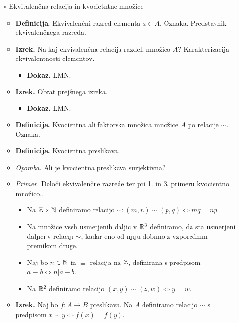 \begin{enumerate}
    \newpage
    \item[$\circ$] Ekvivalenčna relacija in kvocietntne množice
    \begin{itemize}
        \item \colorbox{purple!30}{\textbf{Definicija.}} Ekvivalenčni razred elementa $a \in A$. Oznaka. Predstavnik ekvivalenčnega razreda.
        \item \colorbox{blue!30}{\textbf{Izrek.}} Na kaj ekvivalenčna relacija razdeli množico $A$? Karakterizacija ekvivalentnosti elementov.
        \begin{itemize}
            \item \colorbox{green!30}{\textbf{Dokaz.}} LMN.
        \end{itemize}
        \item \colorbox{blue!30}{\textbf{Izrek.}} Obrat prejšnega izreka.
        \begin{itemize}
            \item \colorbox{green!30}{\textbf{Dokaz.}} LMN.
        \end{itemize}
        \item \colorbox{purple!30}{\textbf{Definicija.}} Kvocientna ali faktorska množica množice $A$ po relacije $\sim$. Oznaka.
        \item \colorbox{purple!30}{\textbf{Definicija.}} Kvocientna preslikava.
        \item \colorbox{yellow!30}{\emph{Opomba.}} Ali je kvocientna preslikava surjektivna?
        \item \colorbox{yellow!30}{\emph{Primer.}} Določi ekvivalenčne razrede ter pri 1. in 3. primeru kvocientno množico..
        \begin{itemize}
            \item Na $\mathbb{Z} \times \mathbb{N}$ definiramo relacijo $\sim: (m,n) \sim (p, q) \Leftrightarrow mq = np$.
            \item Na množice vseh usmerjenih daljic v $\mathbb{R}^3$ definiramo, da sta usmerjeni daljici v relaciji $\sim$, kadar eno od njiju dobimo z vzporednim premikom druge. 
            \item Naj bo $n \in \mathbb{N}$ in $\equiv$ relacija na $\mathbb{Z}$, definirana s predpisom $a \equiv b \Leftrightarrow n | a -b$. 
            \item Na $\mathbb{R}^2$ definiramo relacijo $(x,y) \sim (z,w) \Leftrightarrow y = w$.
        \end{itemize}
        \item \colorbox{blue!30}{\textbf{Izrek.}} Naj bo $f: A \to B$ preslikava. Na $A$ definiramo relacijo $\sim$ s predpisom $x \sim y \Leftrightarrow f(x) = f(y)$.

\end{itemize}
\end{enumerate}
